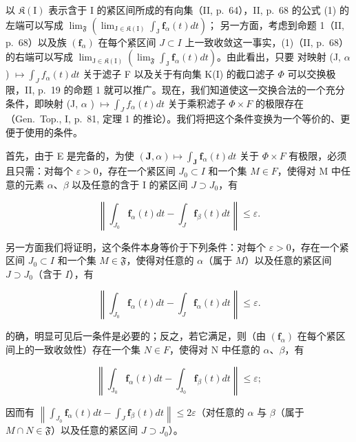 以 \(\mathfrak{K}(\mathrm{I})\) 表示含于 I 的紧区间所成的有向集（II, p.~64），II, p.~68 的公式 (1) 的左端可以写成 \(\lim_{\mathfrak{F}}\left(\lim_{\mathrm{J}\in \mathfrak{K}(\mathrm{I})}\int_{\mathrm{J}}\mathbf{f}_{\alpha}(t)dt\right)\)；
另一方面，考虑到命题 1（II, p.~68）以及族 \((\mathbf{f}_{\alpha})\) 在每个紧区间 \(J \subset I\) 上一致收敛这一事实，(1)（II, p.~68）的右端可以写成 \(\lim_{\mathrm{J} \in \mathfrak{K}(\mathrm{I})} \left( \lim_{\mathfrak{F}} \int_{\mathrm{J}} \mathbf{f}_{\alpha}(t) dt \right)\)。由此看出，只要
对映射 (J, \(\alpha\) ) \(\mapsto \int_{J} f_{\alpha}(t) dt\) 关于滤子 F 以及关于有向集 K(I) 的截口滤子 \(\Phi\) 可以交换极限，II, p.~19 的命题 1 就可以推广。现在，我们知道使这一交换合法的一个充分条件，即映射 (J, \(\alpha\) ) \(\mapsto \int_{J} f_{\alpha}(t) dt\) 关于乘积滤子 \(\Phi \times F\) 的极限存在（Gen.~Top., I, p.~81, 定理 1 的推论）。我们将把这个条件变换为一个等价的、更便于使用的条件。

首先，由于 E 是完备的，为使 \((\mathbf{J}, \alpha) \mapsto \int_{\mathbf{J}} \mathbf{f}_{\alpha}(t) dt\) 关于 \(\Phi \times F\) 有极限，必须且只需：对每个 \(\varepsilon > 0\)，存在一个紧区间 \(J_{0} \subset I\) 和一个集 \(M \in F\)，使得对 M 中任意的元素 \(\alpha\)、\(\beta\) 以及任意的含于 I 的紧区间 \(J \supset J_{0}\)，有

\[
\left\| \int_ {J _ {0}} \mathbf {f} _ {\alpha} (t) d t - \int_ {J} \mathbf {f} _ {\beta} (t) d t \right\| \leqslant \varepsilon .\tag{4}
\]

另一方面我们将证明，这个条件本身等价于下列条件：对每个 \(\varepsilon > 0\)，存在一个紧区间 \(J_0 \subset I\) 和一个集 \(M \in \mathfrak{F}\)，使得对任意的 \(\alpha\)（属于 \(M\)）以及任意的紧区间 \(J \supset J_0\)（含于 \(I\)），有

\[
\left\| \int_ {J _ {0}} \mathbf {f} _ {\alpha} (t) d t - \int_ {J} \mathbf {f} _ {\alpha} (t) d t \right\| \leqslant \varepsilon .\tag{5}
\]

的确，明显可见后一条件是必要的；反之，若它满足，则（由 \((\mathbf{f}_{\alpha})\) 在每个紧区间上的一致收敛性）存在一个集 \(N \in F\)，使得对 N 中任意的 \(\alpha\)、\(\beta\)，有

\[
\left\| \int_ {\mathrm{J} _ {0}} \mathbf {f} _ {\alpha} (t) d t - \int_ {\mathrm{J} _ {0}} \mathbf {f} _ {\beta} (t) d t \right\| \leqslant \varepsilon ;\tag{6}
\]

因而有 \(\left\|\int_{J_{0}}\mathbf{f}_{\alpha}(t)dt-\int_{J}\mathbf{f}_{\beta}(t)dt\right\|\leqslant2\varepsilon\)（对任意的 \(\alpha\) 与 \(\beta\)（属于 \(M\cap N\in\mathfrak{F}\)）以及任意的紧区间 \(J\supset J_{0}\)）。

